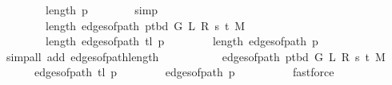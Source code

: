 \begin{isabellebody}
\ \ \ \ \ \ {\isachardoublequoteopen}{}\ {\isasymle}\ length\ {\isacharquery}{\kern0pt}p{\isachardoublequoteclose}\isanewline
\ \ \ \ \ \ \isamarkupfalse%
\ simp{\isacharplus}{\kern0pt}\isanewline
\ \ \ \ \isamarkupfalse%
\isanewline
\ \ \ \ \ \ {\isachardoublequoteopen}{}\ {\isasymle}\ length\ {\isacharparenleft}{\kern0pt}edges{\isacharunderscore}{\kern0pt}of{\isacharunderscore}{\kern0pt}path\ {\isacharparenleft}{\kern0pt}p{\isacharunderscore}{\kern0pt}tbd\ G\ L\ R\ s\ t\ M{\isacharparenright}{\kern0pt}{\isacharparenright}{\kern0pt}{\isachardoublequoteclose}\isanewline
\ \ \ \ \ \ {\isachardoublequoteopen}{}\ {\isasymle}\ length\ {\isacharparenleft}{\kern0pt}edges{\isacharunderscore}{\kern0pt}of{\isacharunderscore}{\kern0pt}path\ {\isacharparenleft}{\kern0pt}tl\ {\isacharquery}{\kern0pt}p{\isacharparenright}{\kern0pt}{\isacharparenright}{\kern0pt}{\isachardoublequoteclose}\isanewline
\ \ \ \ \ \ {\isachardoublequoteopen}{}\ {\isasymle}\ length\ {\isacharparenleft}{\kern0pt}edges{\isacharunderscore}{\kern0pt}of{\isacharunderscore}{\kern0pt}path\ {\isacharquery}{\kern0pt}p{\isacharparenright}{\kern0pt}{\isachardoublequoteclose}\isanewline
\ \ \ \ \ \ \isamarkupfalse%
\ {\isacharparenleft}{\kern0pt}simp{\isacharunderscore}{\kern0pt}all\ add{\isacharcolon}{\kern0pt}\ edges{\isacharunderscore}{\kern0pt}of{\isacharunderscore}{\kern0pt}path{\isacharunderscore}{\kern0pt}length{\isacharparenright}{\kern0pt}\isanewline
\ \ \ \ \isamarkupfalse%
\isanewline
\ \ \ \ \ \ {\isachardoublequoteopen}edges{\isacharunderscore}{\kern0pt}of{\isacharunderscore}{\kern0pt}path\ {\isacharparenleft}{\kern0pt}p{\isacharunderscore}{\kern0pt}tbd\ G\ L\ R\ s\ t\ M{\isacharparenright}{\kern0pt}\ {\isasymnoteq}\ {\isacharbrackleft}{\kern0pt}{\isacharbrackright}{\kern0pt}{\isachardoublequoteclose}\isanewline
\ \ \ \ \ \ {\isachardoublequoteopen}edges{\isacharunderscore}{\kern0pt}of{\isacharunderscore}{\kern0pt}path\ {\isacharparenleft}{\kern0pt}tl\ {\isacharquery}{\kern0pt}p{\isacharparenright}{\kern0pt}\ {\isasymnoteq}\ {\isacharbrackleft}{\kern0pt}{\isacharbrackright}{\kern0pt}{\isachardoublequoteclose}\isanewline
\ \ \ \ \ \ {\isachardoublequoteopen}edges{\isacharunderscore}{\kern0pt}of{\isacharunderscore}{\kern0pt}path\ {\isacharquery}{\kern0pt}p\ {\isasymnoteq}\ {\isacharbrackleft}{\kern0pt}{\isacharbrackright}{\kern0pt}{\isachardoublequoteclose}\isanewline
\ \ \ \ \ \ \isamarkupfalse%
\ fastforce{\isacharplus}{\kern0pt}\isanewline
\ \ \isamarkupfalse%

\end{isabellebody}
